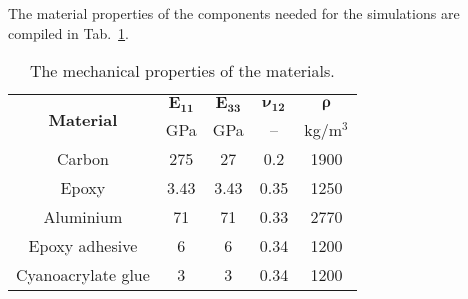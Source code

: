The material properties of the components needed for the simulations are compiled in Tab.~\ref{tab:properties}.
\begin{table}[H]
	\small
	\tabcolsep=0.75cm
	\caption{\label{tab:properties}The mechanical properties of the materials.}
	\begin{tabular}{ccccc}\toprule
		\multirow{2}{*}{\textbf{Material}} & $\boldsymbol{E_{11}}$ & $\boldsymbol{E_{33}}$ & $\boldsymbol{\nu_{12}}$ & $\boldsymbol{\rho}$ \\ & GPa & GPa & -- & kg/m\(^3\)\\
		\midrule
		Carbon & 275 & 27 & 0.2 & 1900\\
		Epoxy & 3.43 & 3.43 & 0.35 & 1250\\
		Aluminium & 71 & 71 & 0.33 & 2770\\
		Epoxy adhesive & 6 & 6 & 0.34 & 1200\\
		Cyanoacrylate glue & 3 & 3 & 0.34 & 1200\\		
		\bottomrule
	\end{tabular}
\end{table}
